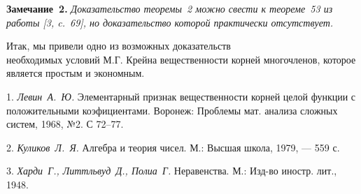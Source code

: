 \textbf{Замечание~2.} {\it Доказательство теоремы~2 можно свести к теореме~53 из работы [3, c.~69], но доказательство которой практически отсутствует. }

Итак, мы привели одно из возможных доказательств \\ необходимых условий М.Г. Крейна вещественности корней многочленов, которое является простым и экономным.


\litlist

1. {\it Левин~А.~Ю.} Элементарный признак вещественности корней целой функции с положительными коэфициентами. Воронеж: Проблемы мат. анализа сложных систем, 1968, №2. С 72–77.

2. {\it Куликов~Л.~Я.} Алгебра и теория чисел. М.: Высшая школа, 1979, — 559 с.

3. {\it Харди~Г., Литтльвуд~Д., Полиа~Г.} Неравенства. М.: Изд-во иностр. лит., 1948.
